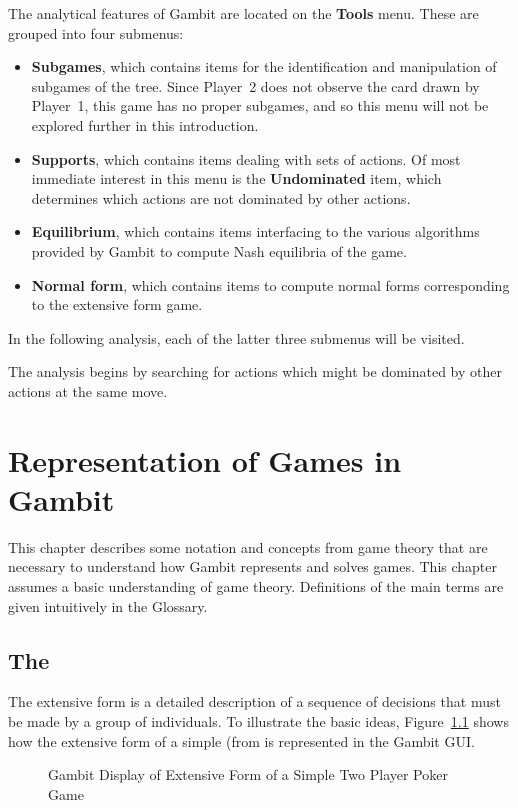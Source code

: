 \documentclass[12pt]{report}
\begin{document}
The analytical features of Gambit are located on the \textbf{Tools}
menu.  These are grouped into four submenus:
\begin{itemize}
\item \textbf{Subgames}, which contains items for the identification
and manipulation of subgames of the tree.  Since Player~2 does not
observe the card drawn by Player~1, this game has no proper subgames,
and so this menu will not be explored further in this introduction.
\item \textbf{Supports}, which contains items dealing with sets of
actions.  Of most immediate interest in this menu is the
\textbf{Undominated} item, which determines which actions are not
dominated by other actions.
\item \textbf{Equilibrium}, which contains items interfacing to the
various algorithms provided by Gambit to compute Nash equilibria of
the game.
\item \textbf{Normal form}, which contains items to compute normal
forms corresponding to the extensive form game.
\end{itemize}
In the following analysis, each of the latter three submenus will
be visited.

The analysis begins by searching for actions which might be dominated
by other actions at the same move.     

\chapter{Representation of Games in Gambit}

This chapter describes some notation and concepts from game theory
that are necessary to understand how Gambit represents and solves
games.  This chapter assumes a basic understanding of game
theory.  Definitions of the main terms are given intuitively in the
Glossary.

\section{The }\label{extformsec}

The extensive form is a detailed description of a sequence of decisions 
that must be made by a group of individuals. To illustrate the basic ideas,
 Figure~\ref{fig_samp1} 
shows how the extensive form of a simple 
 (from \cite{Mye:91} is represented
 in the Gambit GUI.  

\begin{figure}\label{fig_samp1}
\caption{Gambit Display of Extensive Form of
		a Simple Two Player Poker Game}\label{fig_samp1}
\end{figure}
\end{document}
